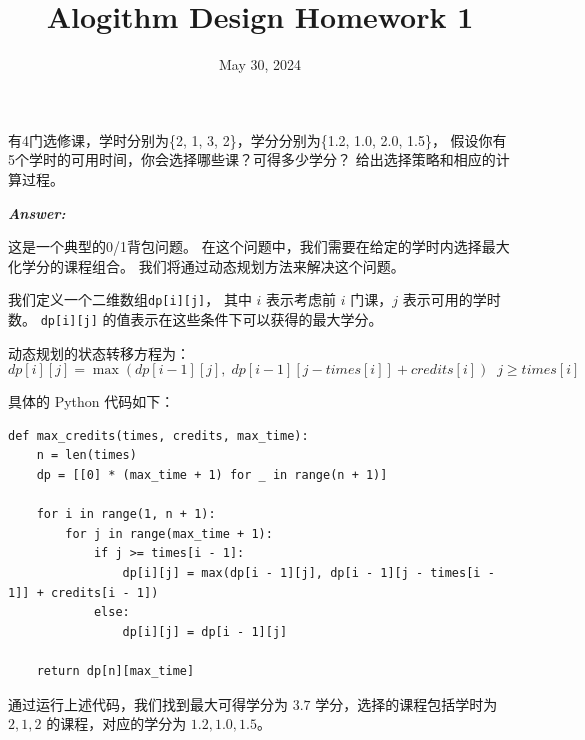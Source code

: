 \documentclass[12pt]{article}
\title{\textbf{Alogithm Design Homework 1}}
\date{May 30, 2024}
\newenvironment{Answer}{
  \vspace{12pt}
  {\large\textbf{\textit{\hspace{-12pt}Answer:}}}\par
  \vspace{8pt}
} {\vspace{24pt}}
\begin{document}
\maketitle

\begin{question}{}{}
有4门选修课，学时分别为\{2, 1, 3, 2\}，学分分别为\{1.2, 1.0, 2.0, 1.5\}，
假设你有5个学时的可用时间，你会选择哪些课？可得多少学分？
给出选择策略和相应的计算过程。
\end{question}
\begin{Answer}
这是一个典型的0/1背包问题。
在这个问题中，我们需要在给定的学时内选择最大化学分的课程组合。
我们将通过动态规划方法来解决这个问题。

我们定义一个二维数组\texttt{dp[i][j]}，
其中 \(i\) 表示考虑前 \(i\) 门课，\(j\) 表示可用的学时数。
\texttt{dp[i][j]} 的值表示在这些条件下可以获得的最大学分。

动态规划的状态转移方程为：
$$dp[i][j]=\max(dp[i-1][j],\;dp[i-1][j-times[i]] + credits[i])\;\;j\geq times[i]$$

具体的 Python 代码如下：
\begin{lstlisting}
def max_credits(times, credits, max_time):
    n = len(times)
    dp = [[0] * (max_time + 1) for _ in range(n + 1)]

    for i in range(1, n + 1):
        for j in range(max_time + 1):
            if j >= times[i - 1]:
                dp[i][j] = max(dp[i - 1][j], dp[i - 1][j - times[i - 1]] + credits[i - 1])
            else:
                dp[i][j] = dp[i - 1][j]

    return dp[n][max_time]
\end{lstlisting}

通过运行上述代码，我们找到最大可得学分为 \(3.7\) 学分，选择的课程包括学时为 \(2, 1, 2\) 的课程，对应的学分为 \(1.2, 1.0, 1.5\)。
\end{Answer}
\end{document}
